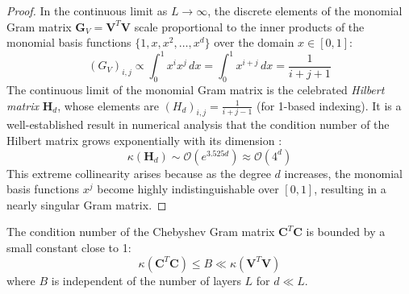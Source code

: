 \begin{proof}
In the continuous limit as $L \to \infty$, the discrete elements of the monomial Gram matrix $\mathbf{G}_V = \mathbf{V}^T \mathbf{V}$ scale proportional to the inner products of the monomial basis functions $\{1, x, x^2, \dots, x^d\}$ over the domain $x \in [0, 1]$:
\begin{equation}
(G_V)_{i, j} \propto \int_0^1 x^i x^j \, dx = \int_0^1 x^{i+j} \, dx = \frac{1}{i+j+1}
\end{equation}
The continuous limit of the monomial Gram matrix is the celebrated \emph{Hilbert matrix} $\mathbf{H}_d$, whose elements are $(H_d)_{i, j} = \frac{1}{i+j-1}$ (for 1-based indexing). It is a well-established result in numerical analysis that the condition number of the Hilbert matrix grows exponentially with its dimension \cite{gautschi1990influence}:
\begin{equation}
\kappa(\mathbf{H}_d) \sim \mathcal{O}\left( e^{3.525 d} \right) \approx \mathcal{O}(4^d)
\end{equation}
This extreme collinearity arises because as the degree $d$ increases, the monomial basis functions $x^j$ become highly indistinguishable over $[0, 1]$, resulting in a nearly singular Gram matrix.
\end{proof}

\begin{theorem}
The condition number of the Chebyshev Gram matrix $\mathbf{C}^T \mathbf{C}$ is bounded by a small constant close to 1:
\begin{equation}
\kappa(\mathbf{C}^T \mathbf{C}) \le B \ll \kappa(\mathbf{V}^T \mathbf{V})
\end{equation}
where $B$ is independent of the number of layers $L$ for $d \ll L$.
\end{theorem}

